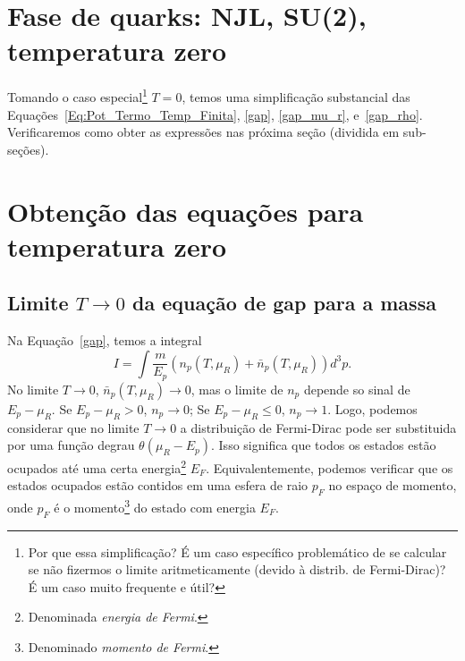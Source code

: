 \section{Fase de quarks: NJL, SU(2), temperatura zero}

Tomando o caso especial\footnote{Por que essa simplificação? É um caso específico problemático de se calcular se não fizermos o limite aritmeticamente (devido à distrib. de Fermi-Dirac)? É um caso muito frequente e útil?} $T = 0$, temos uma simplificação substancial das Equações~\eqref{Eq:Pot_Termo_Temp_Finita}, \eqref{gap}, \eqref{gap_mu_r}, e~\eqref{gap_rho}. Verificaremos como obter as expressões nas próxima seção (dividida em sub-seções).

\section{Obtenção das equações para temperatura zero}
\label{Sec:Obtencao_eq_temp_zero_NJL_quarks}

\subsection{Limite $T \to 0$ da equação de gap para a massa}
\label{Sec:Lim_temp_zero_eq_gap}

Na Equação~\eqref{gap}, temos a integral
\begin{equation}
	I = \int \frac{m}{E_p} (n_p(T, \mu_R) + \bar{n}_p(T, \mu_R)) d^3p.
\end{equation}
%
No limite $T \to 0$, $\bar{n}_p(T, \mu_R) \to 0$, mas o limite de $n_p$ depende so sinal de $E_p - \mu_R$. Se $E_p - \mu_R > 0$, $n_p \to 0$; Se $E_p - \mu_R \leqslant 0$, $n_p \to 1$. Logo, podemos considerar que no limite $T \to 0$ a distribuição de Fermi-Dirac pode ser substituida por uma função degrau $\theta(\mu_R - E_p)$. Isso significa que todos os estados estão ocupados até uma certa energia\footnote{Denominada \emph{energia de Fermi}.} $E_F$. Equivalentemente, podemos verificar que os estados ocupados estão contidos em uma esfera de raio $p_F$ no espaço de momento, onde $p_F$ é o momento\footnote{Denominado \emph{momento de Fermi}.} do estado com energia $E_F$. 

